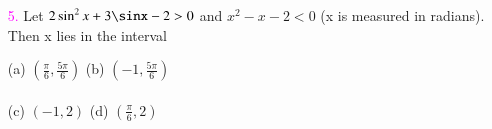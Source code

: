 \documentclass[journal,12pt,twocolumn,article]{IEEEtran}
\theoremstyle{remark}
\begin{document}
\begin{enumerate}
\[\begin{vmatrix}
    $$\sin^2\theta$$ & $$1+\cos^2\theta$$ & $$4\sin4\theta$$\\
    $$\sin^2\theta$$ & $$\cos^2\theta$$ & $$1+4\sin4\theta$$
\end{vmatrix} = 0\] are
\begin{flushright}
    \textcolor{magenta}{}
\end{flushright}
(a) $\frac{7\pi}{24}$\quad
(b) $\frac{5\pi}{24}$\quad
(c) $\frac{11\pi}{24}$\quad
(d) $\frac{\pi}{24}$\\\\\\
\item[\textcolor{magenta}{5.}] Let $2\sin^2x+3\sinx-2>0$ and $x^2-x-2<0$ (x is measured in radians). Then x lies in the interval\begin{flushright}
    \textcolor{magenta}{}
\end{flushright}
(a) $(\frac{\pi}{6},\frac{5\pi}{6})$\quad
(b) $(-1,\frac{5\pi}{6})$\\\\
(c) $(-1,2)$\quad
(d) $(\frac{\pi}{6},2)$
\end{enumerate}
\end{document}
